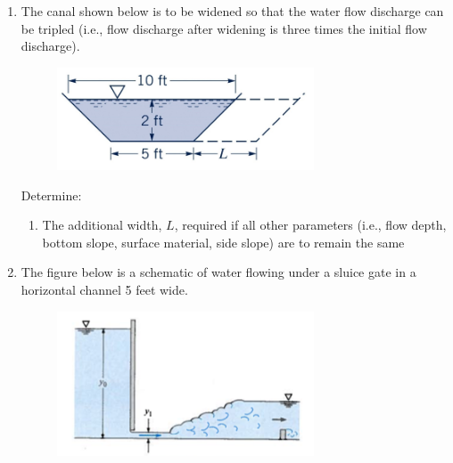 \documentclass[12pt]{article}
\begin{document}
\begin{enumerate}
\clearpage

\item 
The canal shown below is to be widened so that the water flow discharge can be tripled (i.e., flow discharge after widening is three times the initial flow discharge). 

\begin{figure}[htbp] %
   \centering
   \includegraphics[width=3in]{trapezoid.png} 
   \caption{}
   \label{fig:continunity}
\end{figure}

Determine:
\begin{enumerate}
\item The additional width, $L$, required if all other parameters (i.e., flow depth, bottom slope, surface material, side slope) are to remain the same
\end{enumerate}
\item The figure below is a schematic of water flowing under a sluice gate in a horizontal channel 5 feet wide.

\begin{figure}[htbp] %
   \centering
   \includegraphics[width=3in]{sluicegate.png} 
   \caption{}
   \label{fig:venturiflow}
\end{figure}


\end{enumerate}
\end{document}
